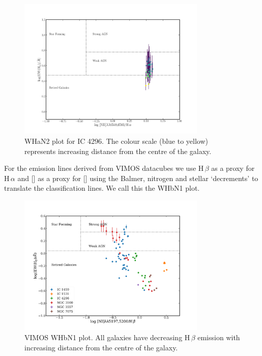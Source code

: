 		\begin{figure}
			\centering
			\includegraphics[width=0.8\textwidth]{chapter5/WHaN2.png}
			\caption[WHaN2 plot for IC 4296]{WHaN2 plot for IC 4296. The colour scale (blue to yellow) represents increasing distance from the centre of the galaxy.}
			\label{fig:WHaN2}
		\end{figure}


		For the emission lines derived from VIMOS datacubes we use H\,$\beta$ as a proxy for H\,$\alpha$ and [] as a proxy for [] using the Balmer, nitrogen and stellar `decrements' to translate the classification lines. We call this the WHbN1 plot.

		\begin{figure}
			\centering
			\includegraphics[width=0.8\textwidth]{chapter5/WHbN1.png}
			\caption[VIMOS WHbN1 plot]{VIMOS WHbN1 plot. All galaxies have decreasing H\,$\beta$ emission with increasing distance from the centre of the galaxy.}
			\label{fig:WHaN2}
		\end{figure}

